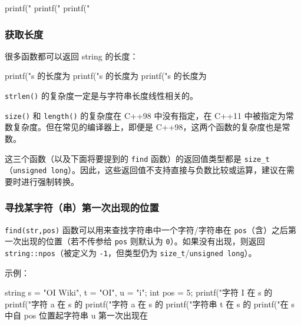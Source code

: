 \begin{codeline}
printf("%
printf("%
printf("%
\end{codeline}


\subsubsection{获取长度}\label{ux83b7ux53d6ux957fux5ea6}

很多函数都可以返回 string 的长度：


\begin{codeline}
printf("s 的长度为 %
printf("s 的长度为 %
printf("s 的长度为 %
\end{codeline}


\texttt{strlen()} 的复杂度一定是与字符串长度线性相关的。

\texttt{size()} 和 \texttt{length()} 的复杂度在 C++98 中没有指定，在 C++11 中被指定为常数复杂度。但在常见的编译器上，即便是 C++98，这两个函数的复杂度也是常数。

这三个函数（以及下面将要提到的 \texttt{find} 函数）的返回值类型都是 \texttt{size\_t}（\texttt{unsigned\ long}）。因此，这些返回值不支持直接与负数比较或运算，建议在需要时进行强制转换。

\subsubsection{寻找某字符（串）第一次出现的位置}\label{ux5bfbux627eux67d0ux5b57ux7b26ux4e32ux7b2cux4e00ux6b21ux51faux73b0ux7684ux4f4dux7f6e}

\texttt{find(str,pos)} 函数可以用来查找字符串中一个字符/字符串在 \texttt{pos}（含）之后第一次出现的位置（若不传参给 \texttt{pos} 则默认为 \texttt{0}）。如果没有出现，则返回 \texttt{string::npos}（被定义为 \texttt{-1}，但类型仍为 \texttt{size\_t}/\texttt{unsigned\ long}）。

示例：


\begin{codeline}
string s = "OI Wiki", t = "OI", u = "i";
int pos = 5;
printf("字符 I 在 s 的 %
printf("字符 a 在 s 的 %
printf("字符 a 在 s 的 %
printf("字符串 t 在 s 的 %
printf("在 s 中自 pos 位置起字符串 u 第一次出现在 %
\end{codeline}


